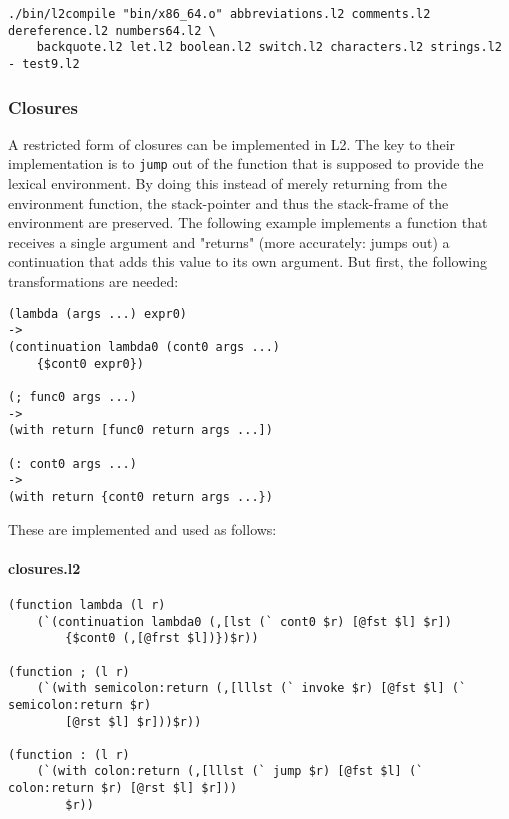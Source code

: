 \documentclass[]{article}
\let\oldparagraph\paragraph
\renewcommand{\paragraph}[1]{\oldparagraph{#1}\mbox{}}
\begin{document}
\begin{verbatim}
./bin/l2compile "bin/x86_64.o" abbreviations.l2 comments.l2 dereference.l2 numbers64.l2 \
    backquote.l2 let.l2 boolean.l2 switch.l2 characters.l2 strings.l2 - test9.l2
\end{verbatim}

\hypertarget{closures}{%
\subsubsection{Closures}\label{closures}}

A restricted form of closures can be implemented in L2. The key to their
implementation is to \texttt{jump} out of the function that is supposed
to provide the lexical environment. By doing this instead of merely
returning from the environment function, the stack-pointer and thus the
stack-frame of the environment are preserved. The following example
implements a function that receives a single argument and "returns"
(more accurately: jumps out) a continuation that adds this value to its
own argument. But first, the following transformations are needed:

\begin{verbatim}
(lambda (args ...) expr0)
->
(continuation lambda0 (cont0 args ...)
    {$cont0 expr0})

(; func0 args ...)
->
(with return [func0 return args ...])

(: cont0 args ...)
->
(with return {cont0 return args ...})
\end{verbatim}

These are implemented and used as follows:

\hypertarget{closures.l2}{%
\paragraph{closures.l2}\label{closures.l2}}

\begin{verbatim}
(function lambda (l r)
    (`(continuation lambda0 (,[lst (` cont0 $r) [@fst $l] $r])
        {$cont0 (,[@frst $l])})$r))

(function ; (l r)
    (`(with semicolon:return (,[lllst (` invoke $r) [@fst $l] (` semicolon:return $r)
        [@rst $l] $r]))$r))

(function : (l r)
    (`(with colon:return (,[lllst (` jump $r) [@fst $l] (` colon:return $r) [@rst $l] $r]))
        $r))
\end{verbatim}
\end{document}
